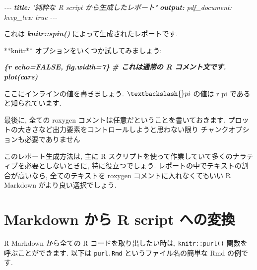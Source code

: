 \documentclass[
  11pt,
  lualatex,ja=standard,jafont=noto]{bxjsreport}
\newenvironment{Shaded}{\begin{snugshade}}{\end{snugshade}}
\newcommand{\AnnotationTok}[1]{\textcolor[rgb]{0.56,0.35,0.01}{\textbf{\textit{#1}}}}
\newcommand{\CommentTok}[1]{\textcolor[rgb]{0.56,0.35,0.01}{\textit{#1}}}
\newcommand{\InformationTok}[1]{\textcolor[rgb]{0.56,0.35,0.01}{\textbf{\textit{#1}}}}
\newcommand{\NormalTok}[1]{#1}
\begin{document}
\begin{Shaded}
\begin{Highlighting}[]
\CommentTok{{-}{-}{-}}
\AnnotationTok{title:}\CommentTok{ "純粋な R script から生成したレポート"}
\AnnotationTok{output:}
\CommentTok{  pdf\_document:}
\CommentTok{    keep\_tex: true}
\CommentTok{{-}{-}{-}}

\NormalTok{これは }\InformationTok{\textasciigrave{}knitr::spin()\textasciigrave{}}\NormalTok{ によって生成されたレポートです.}

\NormalTok{**knitr** オプションをいくつか試してみましょう:}

\InformationTok{\textasciigrave{}\textasciigrave{}\textasciigrave{}\{r echo=FALSE, fig.width=7\}}
\InformationTok{\#  これは通常の R コメント文です.}
\InformationTok{plot(cars)}
\InformationTok{\textasciigrave{}\textasciigrave{}\textasciigrave{}}

\NormalTok{ここにインラインの値を書きましょう. $\textbackslash{}pi$ の値は}
\NormalTok{\textasciigrave{}\textasciigrave{}r  pi  \textasciigrave{}\textasciigrave{}}
\NormalTok{であると知られています.}

\NormalTok{最後に, 全ての roxygen コメントは任意だということを書いておきます.}
\NormalTok{プロットの大きさなど出力要素をコントロールしようと思わない限り}
\NormalTok{チャンクオプションも必要でありません}
\end{Highlighting}
\end{Shaded}

このレポート生成方法は, 主に R スクリプトを使って作業していて多くのナラティブを必要としないときに, 特に役立つでしょう. レポートの中でテキストの割合が高いなら, 全てのテキストを roxygen コメントに入れなくてもいい R Markdown がより良い選択でしょう.

\hypertarget{purl}{%
\section{Markdown から R script への変換}\label{purl}}

R Markdown から全ての R コードを取り出したい時は, \texttt{knitr::purl()} 関数を呼ぶことができます. 以下は \texttt{purl.Rmd} というファイル名の簡単な Rmd の例です.
\end{document}
